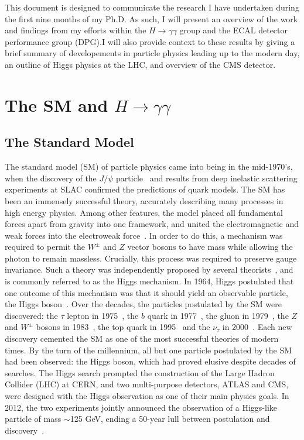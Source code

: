 \documentclass[10pt]{article}
\begin{document}
 This document is designed to communicate the research I have undertaken during the first nine months of my Ph.D. As such, I will present an overview of the work and findings from my efforts within the $H \rightarrow \gamma \gamma$ group and the ECAL detector performance group (DPG).I will also provide context to these results by giving a brief summary of developements in particle physics leading up to the modern day, an outline of Higgs physics at the LHC, and overview of the CMS detector.





\section{The SM and $H \rightarrow \gamma \gamma$}

\subsection{The Standard Model}


The standard model (SM) of particle physics came into being in the mid-1970's, when the discovery of the $J / \psi$ particle~\cite{RichterPsi,TingJ} and results from deep inelastic scattering experiments at SLAC confirmed the predictions of quark models. The SM has been an immensely successful theory, accurately describing many processes in high energy physics. Among other features, the model placed all fundamental forces apart from gravity into one framework, and united the electromagnetic and weak forces into the electroweak force~\cite{GIM,Salam,Weinberg}. In order to do this, a mechanism was required to permit the $W^{\pm}$ and $Z$ vector bosons to have mass while allowing the photon to remain massless. Crucially, this process was required to preserve gauge invariance. Such a theory was independently proposed by several theorists~\cite{BroutEnglert,Higgs1,Higgs2,Kibble1,Higgs3,Kibble2}, and is commonly referred to as the Higgs mechanism. In 1964, Higgs postulated that one outcome of this mechanism was that it should yield an observable particle, the Higgs boson~\cite{Higgs2}. Over the decades, the particles postulated by the SM were discovered: the $\tau$ lepton in 1975~\cite{tauDisc}, the $b$ quark in 1977~\cite{bquarkDisc}, the gluon in 1979~\cite{Gluon1,Gluon2,Gluon3}, the $Z$ and $W^{\pm}$ bosons in 1983~\cite{ZDisc,WDisc}, the top quark in 1995~\cite{tquarkDisc1,tquarkDisc2} and the $\nu_{\tau}$ in 2000~\cite{TauNuDisc}. Each new discovery cemented the SM as one of the most successful theories of modern times. By the turn of the millennium, all but one particle postulated by the SM had been observed: the Higgs boson, which had proved elusive despite decades of searches. The Higgs search prompted the construction of the Large Hadron Collider (LHC) at CERN, and two multi-purpose detectors, ATLAS and CMS, were designed with the Higgs observation as one of their main physics goals. In 2012, the two experiments jointly announced the observation of a Higgs-like particle of mass $\sim$125 GeV, ending a 50-year lull between postulation and discovery~\cite{CMSHDisc,ATLASHDisc}.
\end{document}
